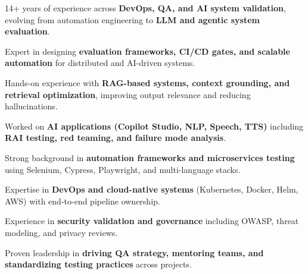 

\begin{cventries}
    \begin{cvitemize}
        \item {14+ years of experience across \textbf{DevOps, QA, and AI system validation}, evolving from automation engineering to \textbf{LLM and agentic system evaluation}.}
        \item {Expert in designing \textbf{evaluation frameworks, CI/CD gates, and scalable automation} for distributed and AI-driven systems.}
        \item {Hands-on experience with \textbf{RAG-based systems, context grounding, and retrieval optimization}, improving output relevance and reducing hallucinations.}
        \item {Worked on \textbf{AI applications (Copilot Studio, NLP, Speech, TTS)} including \textbf{RAI testing, red teaming, and failure mode analysis}.}
        \item {Strong background in \textbf{automation frameworks and microservices testing} using Selenium, Cypress, Playwright, and multi-language stacks.}
        \item {Expertise in \textbf{DevOps and cloud-native systems} (Kubernetes, Docker, Helm, AWS) with end-to-end pipeline ownership.}
        \item {Experience in \textbf{security validation and governance} including OWASP, threat modeling, and privacy reviews.}
        \item {Proven leadership in \textbf{driving QA strategy, mentoring teams, and standardizing testing practices} across projects.}
    \end{cvitemize}
\end{cventries}

